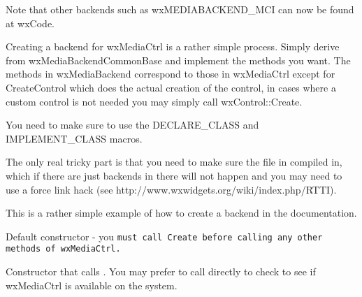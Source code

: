 Note that other backends such as wxMEDIABACKEND\_MCI can now be
found at wxCode.

\label{creatingabackendwxmediactrl}

Creating a backend for wxMediaCtrl is a rather simple process. Simply derive
from wxMediaBackendCommonBase and implement the methods you want. The methods
in wxMediaBackend correspond to those in wxMediaCtrl except for CreateControl
which does the actual creation of the control, in cases where a custom control
is not needed you may simply call wxControl::Create.

You need to make sure to use the DECLARE\_CLASS and IMPLEMENT\_CLASS macros.

The only real tricky part is that you need to make sure the file in compiled
in, which if there are just backends in there will not happen and you may need
to use a force link hack (see http://www.wxwidgets.org/wiki/index.php/RTTI).

This is a rather simple example of how to create a backend in the
 documentation.

\label{wxmediactrlwxmediactrl}


Default constructor - you \tt{must} call Create before calling any other methods
of wxMediaCtrl.


Constructor that calls .  You may prefer to call  directly to check to see if wxMediaCtrl is available on the system.



